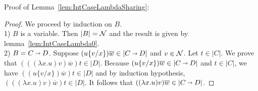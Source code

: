 \documentclass{llncs} %
\newif\ifnonotes\nonotesfalse
\newcommand{\Comment}[1]{\ifnonotes\else{\color{red}    \noindent{\bf Comment: }#1}\fi}
\begin{document}
Proof of Lemma~\ref{lem:IntCaseLambdaSharing}:

\begin{proof}
 We proceed by induction on $B$.
\\
1) $B$ is a variable. Then $|B| = \mathcal{N}$ and the result is given by lemma~\ref{lem:IntCaseLambda0}.
\\
2) $B= C\vlim D$.
Suppose $(u\{v/x\})\overline{w} \in |C\vlim D|$ and $v\in\mathcal{N}$. Let $t\in|C|$. We prove that  $(((\lambda x.u) v)\overline{w})t \in |D|$. Because $(u\{v/x\})\overline{w} \in |C\vlim D|$ and $t\in|C|$, we have $((u\{v/x\})\overline{w})t \in |D|$ and by induction hypothesis, $(((\lambda x.u) v)\overline{w})t \in |D|$. It follows that $((\lambda x.u) v)\overline{w} \in |C\vlim D|$.
\end{proof}
%
%
%
%
%
%
%
%
%
%
\end{document}
